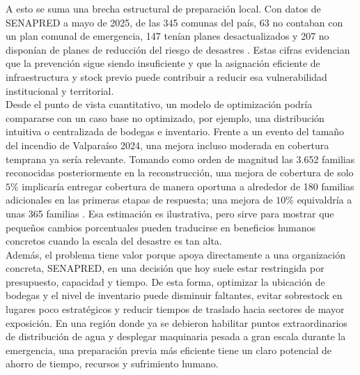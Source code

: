 \documentclass[letterpaper]{article}
\begin{document}
\begin{flushleft}
A esto se suma una brecha estructural de preparaci\'on local. Con datos de SENAPRED a mayo de 2025, de las 345 comunas del pa\'is, 63 no contaban con un plan comunal de emergencia, 147 ten\'ian planes desactualizados y 207 no dispon\'ian de planes de reducci\'on del riesgo de desastres \cite{Dipres2025}. Estas cifras evidencian que la prevenci\'on sigue siendo insuficiente y que la asignaci\'on eficiente de infraestructura y stock previo puede contribuir a reducir esa vulnerabilidad institucional y territorial.\\

Desde el punto de vista cuantitativo, un modelo de optimizaci\'on podr\'ia compararse con un caso base no optimizado, por ejemplo, una distribuci\'on intuitiva o centralizada de bodegas e inventario. Frente a un evento del tama\~no del incendio de Valpara\'iso 2024, una mejora incluso moderada en cobertura temprana ya ser\'ia relevante. Tomando como orden de magnitud las 3.652 familias reconocidas posteriormente en la reconstrucci\'on, una mejora de cobertura de solo $5\%$ implicar\'ia entregar cobertura de manera oportuna a alrededor de 180 familias adicionales en las primeras etapas de respuesta; una mejora de $10\%$ equivaldr\'ia a unas 365 familias \cite{Minvu2025}. Esa estimaci\'on es ilustrativa, pero sirve para mostrar que peque\~nos cambios porcentuales pueden traducirse en beneficios humanos concretos cuando la escala del desastre es tan alta.\\

Adem\'as, el problema tiene valor porque apoya directamente a una organizaci\'on concreta, SENAPRED, en una decisi\'on que hoy suele estar restringida por presupuesto, capacidad y tiempo. De esta forma, optimizar la ubicaci\'on de bodegas y el nivel de inventario puede disminuir faltantes, evitar sobrestock en lugares poco estrat\'egicos y reducir tiempos de traslado hacia sectores de mayor exposici\'on. En una regi\'on donde ya se debieron habilitar puntos extraordinarios de distribuci\'on de agua y desplegar maquinaria pesada a gran escala durante la emergencia, una preparaci\'on previa m\'as eficiente tiene un claro potencial de ahorro de tiempo, recursos y sufrimiento humano.


\end{flushleft}
\end{document}
